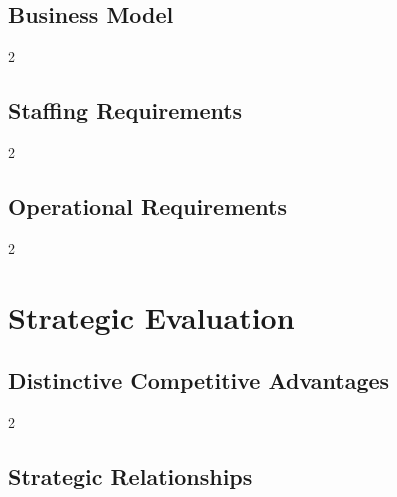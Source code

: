 \documentclass[9pt,]{book}
\begin{document}
\hypertarget{business-model}{%
\section{Business Model}\label{business-model}}

\begin {multicols}{2}

\lipsum

\end {multicols}

\hypertarget{staffing-requirements}{%
\section{Staffing Requirements}\label{staffing-requirements}}

\begin {multicols}{2}

\lipsum

\end {multicols}

\hypertarget{operational-requirements}{%
\section{Operational Requirements}\label{operational-requirements}}

\begin {multicols}{2}

\lipsum

\end {multicols}

\hypertarget{strategic-evaluation}{%
\chapter{Strategic Evaluation}\label{strategic-evaluation}}

\hypertarget{distinctive-competitive-advantages}{%
\section{Distinctive Competitive
Advantages}\label{distinctive-competitive-advantages}}

\begin {multicols}{2}

\lipsum

\end {multicols}

\hypertarget{strategic-relationships}{%
\section{Strategic Relationships}\label{strategic-relationships}}
\end{document}

